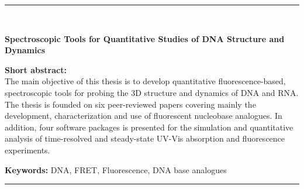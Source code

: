 \cleardoublepage
\begin{vcentrepage}
\noindent\rule[2pt]{\textwidth}{0.8pt}\\
\begin{center}
{\Large\textbf{Spectroscopic Tools for Quantitative Studies of DNA Structure and Dynamics}}
\end{center}
{\large\textbf{Short abstract:}\\}
The main objective of this thesis is to develop quantitative fluorescence-based, spectroscopic tools for probing the 3D structure and dynamics of DNA and RNA. The thesis is founded on six peer-reviewed papers covering mainly the development, characterization and use of fluorescent nucleobase analogues. In addition, four software packages is presented for the simulation and quantitative analysis of time-resolved and steady-state UV-Vis absorption and fluorescence experiments.

{\large\textbf{Keywords:}}
DNA, FRET, Fluorescence, DNA base analogues

\noindent\rule[2pt]{\textwidth}{0.8pt}
\end{vcentrepage}
